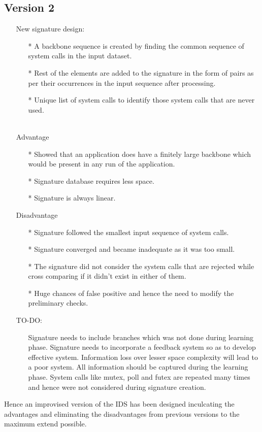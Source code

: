 \subsection{Version 2}
\begin{itemize}
    \item[] {New signature design:}
        \begin{itemize}
            \item[*] A backbone sequence is created by finding the common sequence of system calls in the input dataset.
            \item[*] Rest of the elements are added to the signature in the form of pairs as per their occurrences in the input sequence after processing.
            \item[*] Unique list of system calls to identify those system calls that are never used. \\ \\
        \end{itemize}
\end{itemize}
\begin{itemize}
    \item[] {Advantage}
        \begin{itemize}
            \item[*] Showed that an application does have a finitely large backbone which would be present in any run of the application.
            \item[*] Signature database requires less space.
            \item[*] Signature is always linear.
        \end{itemize}
    \item[] {Disadvantage}
        \begin{itemize}
            \item[*] Signature followed the smallest input sequence of system calls.
            \item[*] Signature converged and became inadequate as it was too small.
            \item[*] The signature did not consider the system calls that are rejected while cross comparing if it didn't exist in either of them.
            \item[*] Huge chances of false positive and hence the need to modify the preliminary checks. \\
        \end{itemize}
    \item[] {TO-DO:}
        \begin{itemize}                                        
            \item[] Signature needs to include branches which was not done during learning phase. Signature needs to incorporate a feedback system so as to develop effective system. Information loss over lesser space complexity will lead to a poor system. All information should be captured during the learning phase. System calls like mutex, poll and futex are repeated many times and hence were not considered during signature creation.
        \end{itemize}
\end{itemize}
Hence an improvised version of the IDS has been designed inculcating the advantages and eliminating the disadvantages from previous versions to the maximum extend possible.
